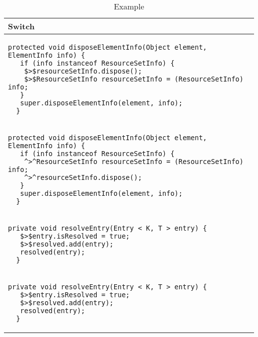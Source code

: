 \begin{table}[p]
\begin{tabular}{ | m{11cm} | }
  \hline
  Switch \\
  \hline
  {\begin{lstlisting}[style=table]
  protected void disposeElementInfo(Object element, ElementInfo info) {
   if (info instanceof ResourceSetInfo) {
    $>$resourceSetInfo.dispose();
    $>$ResourceSetInfo resourceSetInfo = (ResourceSetInfo) info;
   }
   super.disposeElementInfo(element, info);
  }
  \end{lstlisting}} \\
  {\begin{lstlisting}[style=table]
  protected void disposeElementInfo(Object element, ElementInfo info) {
   if (info instanceof ResourceSetInfo) {
    ^>^ResourceSetInfo resourceSetInfo = (ResourceSetInfo) info;
    ^>^resourceSetInfo.dispose();
   }
   super.disposeElementInfo(element, info);
  }
  \end{lstlisting}} \\
  \hline
  \hline
  {\begin{lstlisting}[style=table]
  private void resolveEntry(Entry < K, T > entry) {
   $>$entry.isResolved = true;
   $>$resolved.add(entry);
   resolved(entry);
  }
  \end{lstlisting}} \\
  {\begin{lstlisting}[style=table]
  private void resolveEntry(Entry < K, T > entry) {
   $>$entry.isResolved = true;
   $>$resolved.add(entry);
   resolved(entry);
  }
  \end{lstlisting}} \\
  \hline
\end{tabular}
\caption{Example}
\label{switch_showcase_table}
\end{table}
